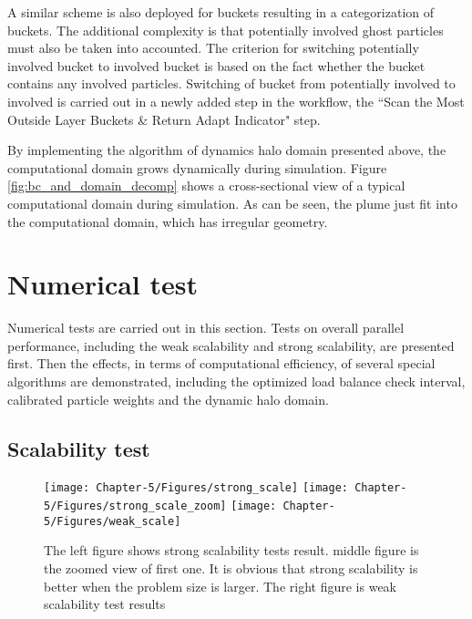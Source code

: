 A similar scheme is also deployed for buckets resulting in a categorization of buckets. The additional complexity is that potentially involved ghost particles must also be taken into accounted. The criterion for switching potentially involved bucket to involved bucket is based on the fact whether the bucket contains any involved particles. Switching of bucket from potentially involved to involved is carried out in a newly added step in the workflow, the ``Scan the Most Outside Layer Buckets \& Return Adapt Indicator" step.

By implementing the algorithm of dynamics halo domain presented above, the computational domain grows dynamically during simulation. Figure \ref{fig:bc_and_domain_decomp} shows a cross-sectional view of a typical computational domain during simulation. As can be seen, the plume just fit into the computational domain, which has irregular geometry.

\section{Numerical test} \label{sec:numerical-tests-computation}
Numerical tests are carried out in this section. Tests on overall parallel performance, including the weak scalability and strong scalability, are presented first. Then the effects, in terms of computational efficiency, of several special algorithms are demonstrated, including the optimized load balance check interval, calibrated particle weights and the dynamic halo domain.

\subsection{Scalability test}
\begin{figure*}[!t]
\centering
\texttt{[image: Chapter-5/Figures/strong\_scale]}
\hfil
\texttt{[image: Chapter-5/Figures/strong\_scale\_zoom]}
\hfil
\texttt{[image: Chapter-5/Figures/weak\_scale]}
\caption{The left figure shows strong scalability tests result. middle figure is the zoomed view of first one. It is obvious that strong scalability is better when the problem size is larger. The right figure is weak scalability test results}
\label{fig:2cases_efficiency}
\end{figure*}

